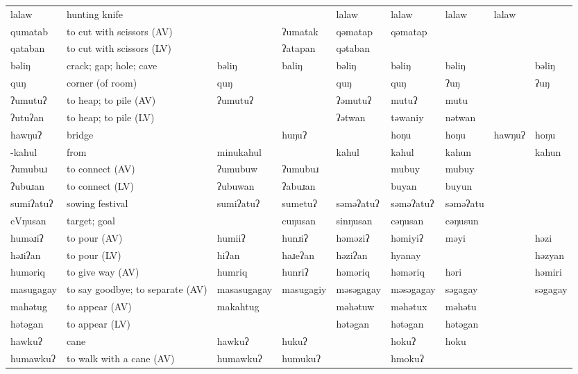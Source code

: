 \begin{landscape}
\begin{longtable}{*{9}{p{}}}
\text{*}lalaw & hunting knife &  &  & lalaw & lalaw & lalaw & lalaw & \\
\text{*}qumatab & to cut with scissors (AV) &  & ʔumatak & qəmatap & qəmatap &  &  & \\
\text{*}qataban & to cut with scissors (LV) &  & ʔatapan & qətaban &  &  &  & \\
\text{*}bəliŋ & crack; gap; hole; cave & bəliŋ & baliŋ & bəliŋ & bəliŋ & bəliŋ &  & bəliŋ\\
\text{*}quŋ & corner (of room) & quŋ &  & quŋ & quŋ & ʔuŋ &  & ʔuŋ\\
\text{*}ʔumutuʔ & to heap; to pile (AV) & ʔumutuʔ &  & ʔəmutuʔ & mutuʔ & mutu &  & \\
\text{*}ʔutuʔan & to heap; to pile (LV) &  &  & ʔətwan & təwaniy & nətwan &  & \\
\text{*}hawŋuʔ & bridge &  & huŋuʔ &  & hoŋu & hoŋu & hawŋuʔ & hoŋu\\
\text{*}-kahul & from & minukahul &  & kahul & kahul & kahun &  & kahun\\
\text{*}ʔumubuɹ & to connect (AV) & ʔumubuw & ʔumubuɹ &  & mubuy & mubuy &  & \\
\text{*}ʔubuɹan & to connect (LV) & ʔubuwan & ʔabuɹan &  & buyan & buyun &  & \\
\text{*}sumiʔatuʔ & sowing festival & sumiʔatuʔ & sumetuʔ & səməʔatuʔ & səməʔatuʔ & səməʔatu &  & \\
\text{*}cVŋusan & target; goal &  & cuŋusan & sinŋusan & cəŋusan & cəŋusun &  & \\
\text{*}huməɹiʔ & to pour (AV) & humiiʔ & hunɹiʔ & həməziʔ & həmiyiʔ & məyi &  & həzi\\
\text{*}həɹiʔan & to pour (LV) & hiʔan & haɹeʔan & həziʔan & hyanay &  &  & həzyan\\
\text{*}huməriq & to give way (AV) & humriq & hunriʔ & həməriq & həməriq & həri &  & həmiri\\
\text{*}masugagay & to say goodbye; to separate (AV) & masasugagay & masugagiy & məsəgagay & məsəgagay & səgagay &  & səgagay\\
\text{*}mahətug & to appear (AV) & makahtug &  & məhətuw & məhətux & məhətu &  & \\
\text{*}hətəgan & to appear (LV) &  &  & hətəgan & hətəgan & hətəgan &  & \\
\text{*}hawkuʔ & cane & hawkuʔ & hukuʔ &  & hokuʔ & hoku &  & \\
\text{*}humawkuʔ & to walk with a cane (AV) & humawkuʔ & humukuʔ &  & hmokuʔ &  &  & \\

\end{longtable}
\end{landscape}
